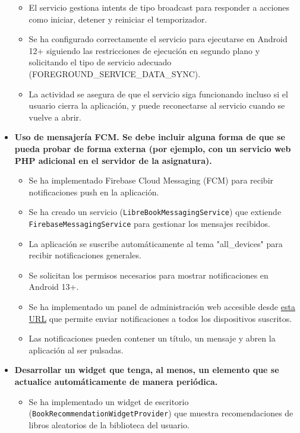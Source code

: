 \documentclass[a4paper,11pt]{report}
\begin{document}
\begin{itemize}
\begin{itemize}
            \item El servicio gestiona intents de tipo broadcast para responder a acciones como iniciar, detener y reiniciar el temporizador.
            \item Se ha configurado correctamente el servicio para ejecutarse en Android 12+ siguiendo las restricciones de ejecución en segundo plano y solicitando el tipo de servicio adecuado (FOREGROUND\_SERVICE\_DATA\_SYNC).
            \item La actividad se asegura de que el servicio siga funcionando incluso si el usuario cierra la aplicación, y puede reconectarse al servicio cuando se vuelve a abrir.
          \end{itemize}
        \item \textbf{Uso de mensajería FCM. Se debe incluir alguna forma de que se pueda probar de forma externa (por ejemplo, con un servicio web PHP adicional en el servidor de la asignatura).}
          \begin{itemize}
            \item Se ha implementado Firebase Cloud Messaging (FCM) para recibir notificaciones push en la aplicación.
            \item Se ha creado un servicio (\texttt{LibreBookMessagingService}) que extiende \texttt{FirebaseMessagingService} para gestionar los mensajes recibidos.
            \item La aplicación se suscribe automáticamente al tema "all\_devices" para recibir notificaciones generales.
            \item Se solicitan los permisos necesarios para mostrar notificaciones en Android 13+.
            \item Se ha implementado un panel de administración web accesible desde \href{http://ec2-51-44-167-78.eu-west-3.compute.amazonaws.com/xgabina001/WEB/admin_panel.php}{esta URL} que permite enviar notificaciones a todos los dispositivos suscritos.
            \item Las notificaciones pueden contener un título, un mensaje y abren la aplicación al ser pulsadas.
          \end{itemize}
        \item \textbf{Desarrollar un widget que tenga, al menos, un elemento que se actualice automáticamente de manera periódica.}
          \begin{itemize}
            \item Se ha implementado un widget de escritorio (\texttt{BookRecommendationWidgetProvider}) que muestra recomendaciones de libros aleatorios de la biblioteca del usuario.

\end{itemize}
\end{itemize}
\end{document}
